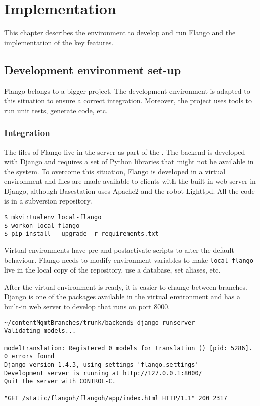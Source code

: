 \chapter{Implementation}
\label{chap:implementation}
This chapter describes the environment to develop and run Flango \cm and the implementation of the key features.

\section{Development environment set-up}
Flango \cm belongs to a bigger project.
The development environment is adapted to this situation to ensure a correct integration.
Moreover, the project uses tools to run unit tests, generate code, etc.

\subsection{Integration}
The files of Flango \cm live in the server as part of the \flangobe .
The backend is developed with Django and requires a set of Python libraries that might not be available in the system.
To overcome this situation, Flango is developed in a virtual environment and files are made available to clients with the built-in web server in Django, although Basestation uses Apache2 and the robot Lighttpd.
All the code is in a subversion repository.

\begin{lstlisting}[caption=lalala, label=virtual-env]
$ mkvirtualenv local-flango
$ workon local-flango
$ pip install --upgrade -r requirements.txt
\end{lstlisting}

Virtual environments have pre and postactivate scripts to alter the default behaviour.
Flango needs to modify environment variables to make \texttt{local-flango} live in the local copy of the repository, use a database, set aliases, etc.

After the virtual environment is ready, it is easier to change between branches.
Django is one of the packages available in the virtual environment and has a built-in web server to develop that runs on port 8000.

\begin{lstlisting}[caption=Django web server, label=virtual-env-server]
~/contentMgmtBranches/trunk/backend$ django runserver
Validating models...

modeltranslation: Registered 0 models for translation () [pid: 5286].
0 errors found
Django version 1.4.3, using settings 'flango.settings'
Development server is running at http://127.0.0.1:8000/
Quit the server with CONTROL-C.

"GET /static/flangoh/flangoh/app/index.html HTTP/1.1" 200 2317
\end{lstlisting}

